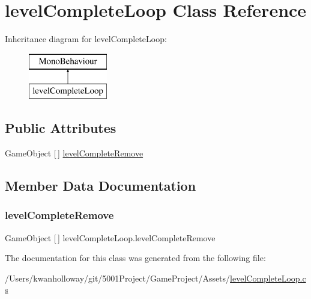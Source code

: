 \hypertarget{classlevel_complete_loop}{}\section{level\+Complete\+Loop Class Reference}
\label{classlevel_complete_loop}
Inheritance diagram for level\+Complete\+Loop\+:\begin{figure}[H]
\begin{center}
\leavevmode
\includegraphics[height=2.000000cm]{classlevel_complete_loop}
\end{center}
\end{figure}
\subsection*{Public Attributes}
\begin{DoxyCompactItemize}
\item 
Game\+Object \mbox{[}$\,$\mbox{]} \hyperlink{classlevel_complete_loop_adfbef5a438c566c7762842f7d5102b67}{level\+Complete\+Remove}
\end{DoxyCompactItemize}


\subsection{Member Data Documentation}
\mbox{\label{classlevel_complete_loop_adfbef5a438c566c7762842f7d5102b67}} 
\subsubsection{\texorpdfstring{level\+Complete\+Remove}{levelCompleteRemove}}
{\footnotesize\ttfamily Game\+Object \mbox{[}$\,$\mbox{]} level\+Complete\+Loop.\+level\+Complete\+Remove}



The documentation for this class was generated from the following file\+:\begin{DoxyCompactItemize}
\item 
/\+Users/kwanholloway/git/5001\+Project/\+Game\+Project/\+Assets/\hyperlink{level_complete_loop_8cs}{level\+Complete\+Loop.\+cs}\end{DoxyCompactItemize}
